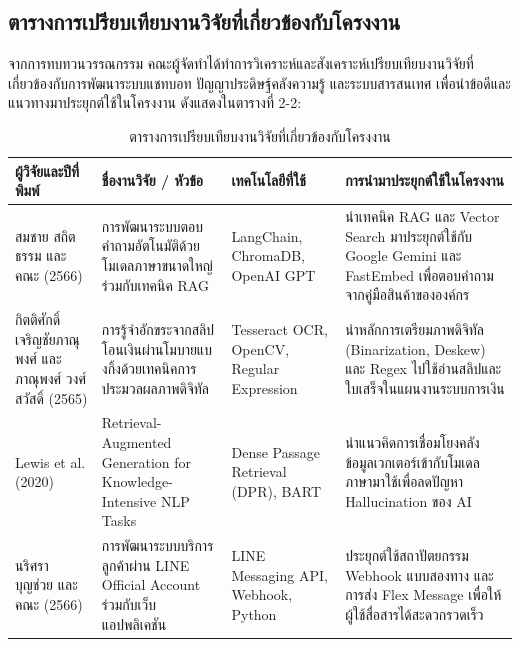 \subsection{ตารางการเปรียบเทียบงานวิจัยที่เกี่ยวข้องกับโครงงาน}
\hspace*{1.3em}
จากการทบทวนวรรณกรรม คณะผู้จัดทำได้ทำการวิเคราะห์และสังเคราะห์เปรียบเทียบงานวิจัยที่เกี่ยวข้องกับการพัฒนาระบบแชทบอท ปัญญาประดิษฐ์คลังความรู้ และระบบสารสนเทศ เพื่อนำข้อดีและแนวทางมาประยุกต์ใช้ในโครงงาน ดังแสดงในตารางที่ 2-2:

\begin{table}[htbp]
\centering
\caption{ตารางการเปรียบเทียบงานวิจัยที่เกี่ยวข้องกับโครงงาน}
\label{tab2:research_comp}
\begin{tabularx}{\textwidth}{| L | L | L | L |}
\hline
\textbf{ผู้วิจัยและปีที่พิมพ์} & \textbf{ชื่องานวิจัย / หัวข้อ} & \textbf{เทคโนโลยีที่ใช้} & \textbf{การนำมาประยุกต์ใช้ในโครงงาน} \\ \hline
สมชาย สถิตธรรม และคณะ (2566) & การพัฒนาระบบตอบคำถามอัตโนมัติด้วยโมเดลภาษาขนาดใหญ่ร่วมกับเทคนิค RAG & LangChain, ChromaDB, OpenAI GPT & นำเทคนิค RAG และ Vector Search มาประยุกต์ใช้กับ Google Gemini และ FastEmbed เพื่อตอบคำถามจากคู่มือสินค้าขององค์กร \\ \hline
กิตติศักดิ์ เจริญชัยภาณุพงศ์ และ ภาณุพงศ์ วงศ์สวัสดิ์ (2565) & การรู้จำอักขระจากสลิปโอนเงินผ่านโมบายแบงกิ้งด้วยเทคนิคการประมวลผลภาพดิจิทัล & Tesseract OCR, OpenCV, Regular Expression & นำหลักการเตรียมภาพดิจิทัล (Binarization, Deskew) และ Regex ไปใช้อ่านสลิปและใบเสร็จในแผนงานระบบการเงิน \\ \hline
Lewis et al. (2020) & Retrieval-Augmented Generation for Knowledge-Intensive NLP Tasks & Dense Passage Retrieval (DPR), BART & นำแนวคิดการเชื่อมโยงคลังข้อมูลเวกเตอร์เข้ากับโมเดลภาษามาใช้เพื่อลดปัญหา Hallucination ของ AI \\ \hline
นริศรา บุญช่วย และคณะ (2566) & การพัฒนาระบบบริการลูกค้าผ่าน LINE Official Account ร่วมกับเว็บแอปพลิเคชัน & LINE Messaging API, Webhook, Python & ประยุกต์ใช้สถาปัตยกรรม Webhook แบบสองทาง และการส่ง Flex Message เพื่อให้ผู้ใช้สื่อสารได้สะดวกรวดเร็ว \\ \hline
\end{tabularx}
\end{table}

